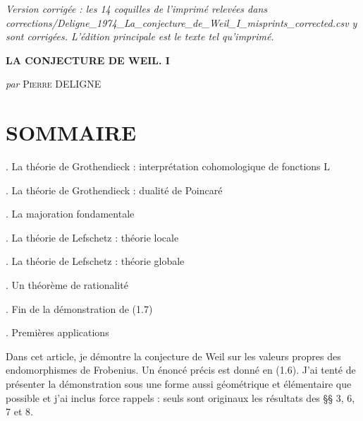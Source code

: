 \documentclass[10pt,leqno]{article}
\begin{document}
\begin{center}\small\itshape Version corrigée : les 14 coquilles de l'imprimé relevées dans corrections/Deligne\_1974\_La\_conjecture\_de\_Weil\_I\_misprints\_corrected.csv y sont corrigées. L'édition principale est le texte tel qu'imprimé.\end{center}

\setcounter{page}{273}


\begin{center}{\Large\bfseries LA CONJECTURE DE WEIL. I}\par\medskip \emph{par} \textsc{Pierre} DELIGNE\end{center}

\label{physical-2}

\section*{SOMMAIRE}

. La théorie de Grothendieck : interprétation cohomologique de fonctions \(\mathrm{L}\)\par

. La théorie de Grothendieck : dualité de Poincaré\par

. La majoration fondamentale\par

. La théorie de Lefschetz : théorie locale\par

. La théorie de Lefschetz : théorie globale\par

. Un théorème de rationalité\par

. Fin de la démonstration de (1.7)\par

. Premières applications\par

\noindent Dans cet article, je démontre la conjecture de Weil sur les valeurs propres des endomorphismes de Frobenius. Un énoncé précis est donné en (1.6). J’ai tenté de présenter la démonstration sous une forme aussi géométrique et élémentaire que possible et j’ai inclus force rappels : seuls sont originaux les résultats des §§ 3, 6, 7 et 8.\par
\end{document}

